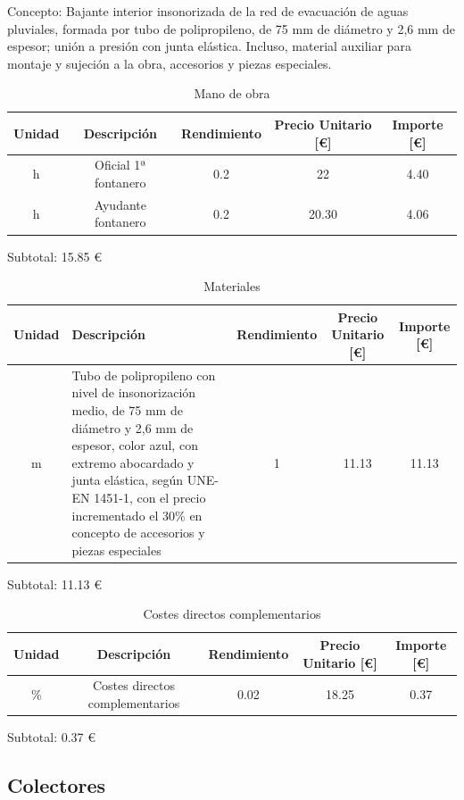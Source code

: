 \documentclass[../main.tex]{subfiles}
\begin{document}
Concepto: Bajante interior insonorizada de la red de evacuación de aguas pluviales, formada por tubo de polipropileno, de 75 mm de diámetro y 2,6 mm de espesor; unión a presión con junta elástica. Incluso, material auxiliar para montaje y sujeción a la obra, accesorios y piezas especiales.

\begin{table}[H]
    \centering
    \begin{tabular}{c|c|c|c|c}
    Unidad & Descripción & Rendimiento & Precio Unitario [€] & Importe [€] \\ \hline
    h&Oficial 1ª fontanero & 0.2 & 22 & 4.40 \\
    h&Ayudante fontanero & 0.2 & 20.30 & 4.06 \\
    
    \end{tabular}
    \caption{Mano de obra}
\end{table}

Subtotal: 15.85 €

\begin{table}[H]
    \centering
    \begin{tabular}{c|p{5.5cm}|c|c|c}
    Unidad & Descripción & Rendimiento & Precio Unitario [€] & Importe [€] \\ \hline
    m&Tubo de polipropileno con nivel de insonorización medio, de 75 mm de diámetro y 2,6 mm de espesor, color azul, con extremo abocardado y junta elástica, según UNE-EN 1451-1, con el precio incrementado el 30\% en concepto de accesorios y piezas especiales& 1 & 11.13 & 11.13 \\
    
    \end{tabular}
    \caption{Materiales}
\end{table}

Subtotal: 11.13 €

\begin{table}[H]
    \centering
    \begin{tabular}{c|c|c|c|c}
    Unidad & Descripción & Rendimiento & Precio Unitario [€] & Importe [€] \\ \hline
    \% & Costes directos complementarios & 0.02 & 18.25 & 0.37 \\
    \end{tabular}
    \caption{Costes directos complementarios}
\end{table} 

Subtotal: 0.37 €

\subsection{Colectores}
\end{document}
